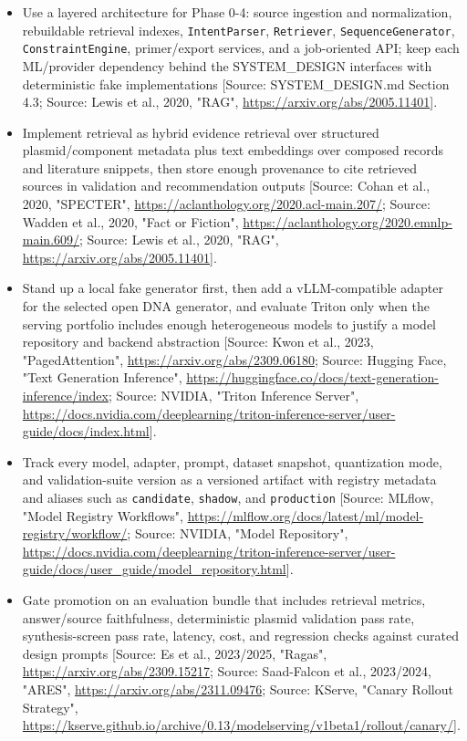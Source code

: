 \documentclass[11pt]{report}
\begin{document}
\begin{itemize}
\item Use a layered architecture for Phase 0-4: source ingestion and normalization, rebuildable retrieval indexes, \texttt{IntentParser}, \texttt{Retriever}, \texttt{SequenceGenerator}, \texttt{ConstraintEngine}, primer/export services, and a job-oriented API; keep each ML/provider dependency behind the SYSTEM\_DESIGN interfaces with deterministic fake implementations [Source: SYSTEM\_DESIGN.md Section 4.3; Source: Lewis et al., 2020, "RAG", \url{https://arxiv.org/abs/2005.11401}].
\item Implement retrieval as hybrid evidence retrieval over structured plasmid/component metadata plus text embeddings over composed records and literature snippets, then store enough provenance to cite retrieved sources in validation and recommendation outputs [Source: Cohan et al., 2020, "SPECTER", \url{https://aclanthology.org/2020.acl-main.207/}; Source: Wadden et al., 2020, "Fact or Fiction", \url{https://aclanthology.org/2020.emnlp-main.609/}; Source: Lewis et al., 2020, "RAG", \url{https://arxiv.org/abs/2005.11401}].
\item Stand up a local fake generator first, then add a vLLM-compatible adapter for the selected open DNA generator, and evaluate Triton only when the serving portfolio includes enough heterogeneous models to justify a model repository and backend abstraction [Source: Kwon et al., 2023, "PagedAttention", \url{https://arxiv.org/abs/2309.06180}; Source: Hugging Face, "Text Generation Inference", \url{https://huggingface.co/docs/text-generation-inference/index}; Source: NVIDIA, "Triton Inference Server", \url{https://docs.nvidia.com/deeplearning/triton-inference-server/user-guide/docs/index.html}].
\item Track every model, adapter, prompt, dataset snapshot, quantization mode, and validation-suite version as a versioned artifact with registry metadata and aliases such as \texttt{candidate}, \texttt{shadow}, and \texttt{production} [Source: MLflow, "Model Registry Workflows", \url{https://mlflow.org/docs/latest/ml/model-registry/workflow/}; Source: NVIDIA, "Model Repository", \url{https://docs.nvidia.com/deeplearning/triton-inference-server/user-guide/docs/user_guide/model_repository.html}].
\item Gate promotion on an evaluation bundle that includes retrieval metrics, answer/source faithfulness, deterministic plasmid validation pass rate, synthesis-screen pass rate, latency, cost, and regression checks against curated design prompts [Source: Es et al., 2023/2025, "Ragas", \url{https://arxiv.org/abs/2309.15217}; Source: Saad-Falcon et al., 2023/2024, "ARES", \url{https://arxiv.org/abs/2311.09476}; Source: KServe, "Canary Rollout Strategy", \url{https://kserve.github.io/archive/0.13/modelserving/v1beta1/rollout/canary/}].

\end{itemize}
\end{document}

